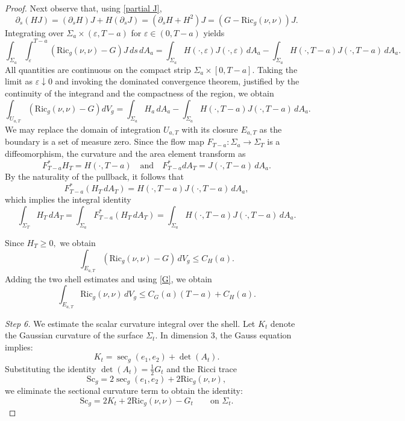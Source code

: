 \documentclass[12pt,oneside,a4paper]{article}
\theoremstyle{mytheorem}
\theoremstyle{remark}
\begin{document}
\begin{proof}
Next observe that,  using \eqref{partial J},
\[
\partial_s(HJ)=(\partial_sH)J+H(\partial_sJ)=(\partial_sH+H^2)J=(G-\mathrm{Ric}_g(\nu,\nu))J.
\]
Integrating over $\Sigma_a\times(\varepsilon,T-a)$ for $\varepsilon\in(0,T-a)$ yields
\[
\int_{\Sigma_a}\int_\varepsilon^{T-a}(\mathrm{Ric}_g(\nu,\nu)-G)J\,ds\,dA_a=\int_{\Sigma_a}H(\cdot,\varepsilon)J(\cdot,\varepsilon)\,dA_a-\int_{\Sigma_a}H(\cdot,T-a)J(\cdot,T-a)\,dA_a.
\]
All quantities are continuous on the compact strip $\Sigma_a\times[0,T-a]$. Taking the limit as $\varepsilon \downarrow 0$ and invoking the dominated convergence theorem, justified by the continuity of the integrand and the compactness of the region, we obtain$$\int_{U_{a,T}} \left( \mathrm{Ric}_g(\nu,\nu) - G \right) dV_g = \int_{\Sigma_a} H_a \, dA_a - \int_{\Sigma_a} H(\cdot, T-a) J(\cdot, T-a) \, dA_a.$$We may replace the domain of integration $U_{a,T}$ with its closure $E_{a,T}$ as the boundary is a set of measure zero. Since the flow map $F_{T-a} : \Sigma_a \to \Sigma_T$ is a diffeomorphism, the curvature and the area element transform as$$F_{T-a}^* H_T = H(\cdot, T-a) \quad \text{and} \quad F_{T-a}^* dA_T = J(\cdot, T-a) \, dA_a.$$By the naturality of the pullback, it follows that$$F_{T-a}^*(H_T \, dA_T) = H(\cdot, T-a) J(\cdot, T-a) \, dA_a,$$which implies the integral identity$$\int_{\Sigma_T} H_T \, dA_T = \int_{\Sigma_a} F_{T-a}^*(H_T \, dA_T) = \int_{\Sigma_a} H(\cdot, T-a) J(\cdot, T-a) \, dA_a.$$

Since $H_T\ge 0,$ we obtain
$$
\int_{E_{a,T}}(\mathrm{Ric}_g(\nu,\nu)-G)\,dV_g\le C_H(a).
$$
Adding the two shell estimates and using \eqref{G}, we obtain
\begin{equation}\label{Ric}
\int_{E_{a,T}} \mathrm{Ric}_g(\nu,\nu)\, dV_g
\le C_G(a)(T-a) + C_H(a).
\end{equation}

\textit{Step 6.} We estimate the scalar curvature integral over the shell.
Let $K_t$ denote the Gaussian curvature of the surface $\Sigma_t$. In dimension $3$, the Gauss equation implies:$$K_t = \sec_g(e_1, e_2) + \det(A_t).$$ Substituting the identity $\det(A_t) = \frac{1}{2} G_t$ and the Ricci trace $$\mathrm{Sc}_g = 2\sec_g(e_1, e_2) + 2\mathrm{Ric}_g(\nu, \nu),$$ we eliminate the sectional curvature term to obtain the identity:$$\mathrm{Sc}_g = 2K_t + 2\mathrm{Ric}_g(\nu, \nu) - G_t \qquad \text{on } \Sigma_t.$$


\end{proof}
\end{document}
